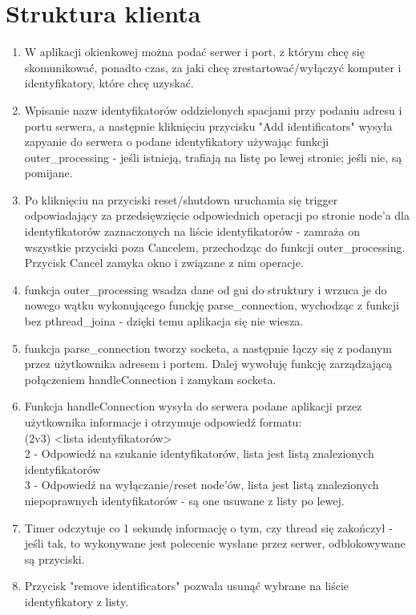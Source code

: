 \documentclass[12pt]{article}
\begin{document}
\section{Struktura klienta}
\begin{enumerate}
	\item W aplikacji okienkowej można podać serwer i port, z którym chcę się skomunikować, ponadto czas, za jaki chcę zrestartować/wyłączyć komputer i identyfikatory, które chcę uzyskać.
	\item Wpisanie nazw identyfikatorów oddzielonych spacjami przy podaniu adresu i portu serwera, a następnie kliknięciu przycisku "Add identificators" wysyła zapyanie do serwera o podane identyfikatory używając funkcji outer\_processing  - jeśli istnieją, trafiają na listę po lewej stronie; jeśli nie, są pomijane.
	\item Po kliknięciu na przyciski reset/shutdown uruchamia się trigger odpowiadający za przedsięwzięcie odpowiednich operacji po stronie node'a dla identyfikatorów zaznaczonych na liście identyfikatorów - zamraża on wszystkie przyciski poza Cancelem, przechodząc do funkcji outer\_processing. Przycisk Cancel zamyka okno i związane z nim operacje.
	\item funkcja outer\_processing wsadza dane od gui do struktury i wrzuca je do nowego wątku wykonującego funckję parse\_connection, wychodząc z funkcji bez pthread\_joina - dzięki temu aplikacja się nie wiesza.
	\item funkcja parse\_connection tworzy socketa, a następnie łączy się z podanym przez użytkownika adresem i portem. Dalej wywołuję funkcję zarządzającą połączeniem handleConnection i zamykam socketa.
	\item Funkcja handleConnection wysyła do serwera podane aplikacji przez użytkownika informacje i otrzymuje odpowiedź formatu:\\
	(2v3) <lista identyfikatorów>\\
	2 - Odpowiedź na szukanie identyfikatorów, lista jest listą znalezionych identyfikatorów\\
	3 - Odpowiedź na wyłączanie/reset node'ów, lista jest listą znalezionych niepoprawnych identyfikatorów - są one usuwane z listy po lewej.
	\item Timer odczytuje co 1 sekundę informację o tym, czy thread się zakończył - jeśli tak, to wykonywane jest polecenie wysłane przez serwer, odblokowywane są przyciski.
	\item Przycisk "remove identificators" pozwala usunąć wybrane na liście identyfikatory z listy. 
\end{enumerate}
\end{document}
